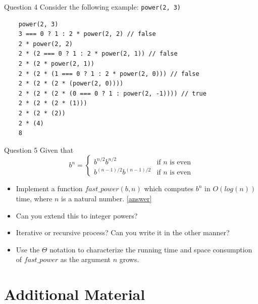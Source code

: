 \documentclass[10pt]{beamer}
\begin{document}
\begin{frame}[fragile]{Question 4}
Consider the following example: \texttt{power(2, 3)}
\begin{verbatim}
    power(2, 3)
    3 === 0 ? 1 : 2 * power(2, 2) // false
    2 * power(2, 2)
    2 * (2 === 0 ? 1 : 2 * power(2, 1)) // false
    2 * (2 * power(2, 1))
    2 * (2 * (1 === 0 ? 1 : 2 * power(2, 0))) // false
    2 * (2 * (2 * (power(2, 0))))
    2 * (2 * (2 * (0 === 0 ? 1 : power(2, -1)))) // true
    2 * (2 * (2 * (1)))
    2 * (2 * (2))
    2 * (4)
    8
\end{verbatim}
\end{frame}

\begin{frame}[fragile]{Question 5}
Given that 
\begin{equation*}
b^n = 
\begin{cases}
  b^{n/2}b^{n/2} &\text{if }n\text{ is even} \\
  b^{(n - 1)/2}b^{(n - 1)/2} &\text{if }n\text{ is even}
\end{cases}
\end{equation*}
\begin{itemize}
\item Implement a function $fast\_power(b, n)$ which computes $b^n$ in $O(log(n))$ time, where $n$ is a natural number. \href{https://share.sourceacademy.nus.edu.sg/fastpower}{[\underline{answer}]}\\

\item Can you extend this to integer powers? \\

\item Iterative or recursive process? Can you write it in the other manner?\\

\item Use the $\Theta$ notation to characterize the running time and space consumption of $fast\_power$ as the argument $n$ grows.
\end{itemize}

\end{frame}

\section[Additional Material]{Additional Material}
\end{document}

